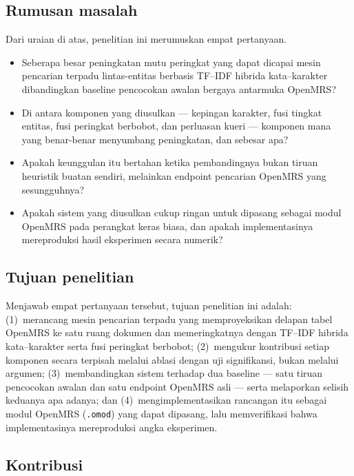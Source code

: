 \documentclass[journal,twoside,web]{ieeecolor}
\begin{document}
\subsection{Rumusan masalah}

Dari uraian di atas, penelitian ini merumuskan empat pertanyaan.

\begin{itemize}
\item[\textbf{RQ1}] Seberapa besar peningkatan mutu peringkat yang dapat dicapai
mesin pencarian terpadu lintas-entitas berbasis TF--IDF hibrida kata--karakter
dibandingkan baseline pencocokan awalan bergaya antarmuka OpenMRS?
\item[\textbf{RQ2}] Di antara komponen yang diusulkan --- kepingan karakter, fusi
tingkat entitas, fusi peringkat berbobot, dan perluasan kueri --- komponen mana
yang benar-benar menyumbang peningkatan, dan sebesar apa?
\item[\textbf{RQ3}] Apakah keunggulan itu bertahan ketika pembandingnya bukan
tiruan heuristik buatan sendiri, melainkan endpoint pencarian OpenMRS yang
sesungguhnya?
\item[\textbf{RQ4}] Apakah sistem yang diusulkan cukup ringan untuk dipasang
sebagai modul OpenMRS pada perangkat keras biasa, dan apakah implementasinya
mereproduksi hasil eksperimen secara numerik?
\end{itemize}

\subsection{Tujuan penelitian}

Menjawab empat pertanyaan tersebut, tujuan penelitian ini adalah:
(1)~merancang mesin pencarian terpadu yang memproyeksikan delapan tabel OpenMRS
ke satu ruang dokumen dan memeringkatnya dengan TF--IDF hibrida kata--karakter
serta fusi peringkat berbobot; (2)~mengukur kontribusi setiap komponen secara
terpisah melalui ablasi dengan uji signifikansi, bukan melalui argumen;
(3)~membandingkan sistem terhadap dua baseline --- satu tiruan pencocokan awalan
dan satu endpoint OpenMRS asli --- serta melaporkan selisih keduanya apa adanya;
dan (4)~mengimplementasikan rancangan itu sebagai modul OpenMRS
(\texttt{.omod}) yang dapat dipasang, lalu memverifikasi bahwa implementasinya
mereproduksi angka eksperimen.

\subsection{Kontribusi}
\end{document}
